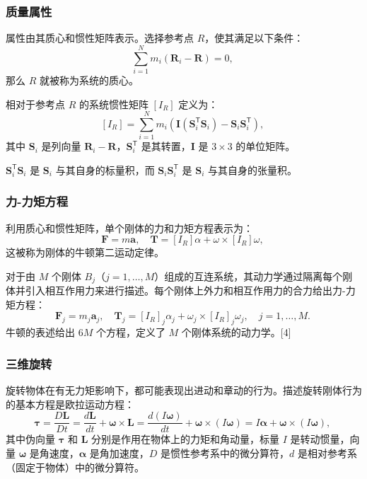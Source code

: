 \subsubsection{质量属性}
属性由其质心和惯性矩阵表示。选择参考点 \( R \)，使其满足以下条件：
\[
\sum_{i=1}^{N} m_{i} (\mathbf{R}_{i} - \mathbf{R}) = 0,~
\]
那么 \( R \) 就被称为系统的质心。

相对于参考点 \( R \) 的系统惯性矩阵 \([I_R]\) 定义为：
\[
[I_{R}] = \sum_{i=1}^{N} m_{i} \left( \mathbf{I} (\mathbf{S}_{i}^{\textsf{T}} \mathbf{S}_{i}) - \mathbf{S}_{i} \mathbf{S}_{i}^{\textsf{T}} \right),~
\]
其中 \( \mathbf{S}_{i} \) 是列向量 \( \mathbf{R}_{i} - \mathbf{R} \)，\( \mathbf{S}_{i}^{\textsf{T}} \) 是其转置，\( \mathbf{I} \) 是 \( 3 \times 3 \) 的单位矩阵。

\({\displaystyle \mathbf {S} _{i}^{\textsf {T}}\mathbf {S} _{i}}\) 是 \(\mathbf{S}_{i}\) 与其自身的标量积，而 \(\mathbf{S}_{i}\mathbf{S}_{i}^{\textsf {T}}\) 是 \(\mathbf{S}_{i}\) 与其自身的张量积。
\subsubsection{力-力矩方程}
利用质心和惯性矩阵，单个刚体的力和力矩方程表示为：
\[
\mathbf{F} = m \mathbf{a}, \quad \mathbf{T} = [I_{R}] \alpha + \omega \times [I_{R}] \omega,~
\]
这被称为刚体的牛顿第二运动定律。

对于由 \( M \) 个刚体 \( B_j \)（\( j = 1, \dots, M \)）组成的互连系统，其动力学通过隔离每个刚体并引入相互作用力来进行描述。每个刚体上外力和相互作用力的合力给出力-力矩方程：
\[
\mathbf{F}_{j} = m_{j} \mathbf{a}_{j}, \quad \mathbf{T}_{j} = [I_{R}]_{j} \alpha_{j} + \omega_{j} \times [I_{R}]_{j} \omega_{j}, \quad j = 1, \dots, M.~
\]
牛顿的表述给出 \( 6M \) 个方程，定义了 \( M \) 个刚体系统的动力学。[4]
\subsubsection{三维旋转}
旋转物体在有无力矩影响下，都可能表现出进动和章动的行为。描述旋转刚体行为的基本方程是欧拉运动方程：
\[
{\boldsymbol {\tau }} = \frac{D \mathbf{L}}{Dt} = \frac{d \mathbf{L}}{dt} + {\boldsymbol {\omega }} \times \mathbf{L} = \frac{d(I{\boldsymbol {\omega }})}{dt} + {\boldsymbol {\omega }} \times (I{\boldsymbol {\omega }}) = I{\boldsymbol {\alpha }} + {\boldsymbol {\omega }} \times (I{\boldsymbol {\omega }}),~
\]
其中伪向量 \(\boldsymbol{\tau}\) 和 \(\mathbf{L}\) 分别是作用在物体上的力矩和角动量，标量 \(I\) 是转动惯量，向量 \(\boldsymbol{\omega}\) 是角速度，\(\boldsymbol{\alpha}\) 是角加速度，\(D\) 是惯性参考系中的微分算符，\(d\) 是相对参考系（固定于物体）中的微分算符。

